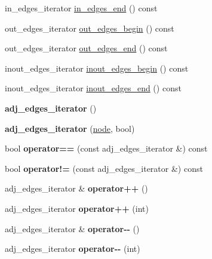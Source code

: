 \begin{DoxyCompactItemize}
in\+\_\+edges\+\_\+iterator \mbox{\hyperlink{classnode_a785cd330f8b4c5c47d3b6e936a7e744e}{in\+\_\+edges\+\_\+end}} () const
\item 
out\+\_\+edges\+\_\+iterator \mbox{\hyperlink{classnode_a7dcb80df22118cea04f77ca8c952d9c2}{out\+\_\+edges\+\_\+begin}} () const
\item 
out\+\_\+edges\+\_\+iterator \mbox{\hyperlink{classnode_a7ce2ba5195a63d4df6b44299a02a9378}{out\+\_\+edges\+\_\+end}} () const
\item 
inout\+\_\+edges\+\_\+iterator \mbox{\hyperlink{classnode_a8677f4dc2acfb64310de1ea866c17340}{inout\+\_\+edges\+\_\+begin}} () const
\item 
inout\+\_\+edges\+\_\+iterator \mbox{\hyperlink{classnode_ad4eec3efcc3c1e572b0492276e20980c}{inout\+\_\+edges\+\_\+end}} () const
\item 
\mbox{\label{classnode_a12cb1a2167f5f03c054de5e707d3156f}} 
{\bfseries adj\+\_\+edges\+\_\+iterator} ()
\item 
\mbox{\label{classnode_a1b7aa43ddd3e7f392479c479400ebb75}} 
{\bfseries adj\+\_\+edges\+\_\+iterator} (\mbox{\hyperlink{classnode}{node}}, bool)
\item 
\mbox{\label{classnode_a7ae20e73507364af0c1df22ecd0df444}} 
bool {\bfseries operator==} (const adj\+\_\+edges\+\_\+iterator \&) const
\item 
\mbox{\label{classnode_aa30fcffcf193cc94d3e1f3fe419ce42a}} 
bool {\bfseries operator!=} (const adj\+\_\+edges\+\_\+iterator \&) const
\item 
\mbox{\label{classnode_a5849d021a696f38d1b2e1d3d3372bbe7}} 
adj\+\_\+edges\+\_\+iterator \& {\bfseries operator++} ()
\item 
\mbox{\label{classnode_ac112a3065e69e4897d38c11980fe1789}} 
adj\+\_\+edges\+\_\+iterator {\bfseries operator++} (int)
\item 
\mbox{\label{classnode_a99fdb299b044facd9cb3f90f18a559fd}} 
adj\+\_\+edges\+\_\+iterator \& {\bfseries operator-\/-\/} ()
\item 
\mbox{\label{classnode_a1e5751de7ba220836ffee941707c277b}} 
adj\+\_\+edges\+\_\+iterator {\bfseries operator-\/-\/} (int)

\end{DoxyCompactItemize}
